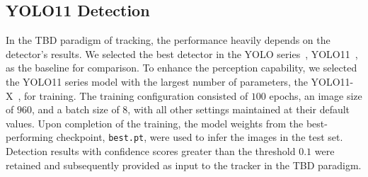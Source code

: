 \subsection{YOLO11 Detection}
In the TBD paradigm of tracking, the performance heavily depends on the detector's results. 
We selected the best detector in the YOLO series~\cite{redmon2016you}, YOLO11~\cite{yolo11}, as the baseline for comparison. 
To enhance the perception capability, we selected the YOLO11 series model with the largest number of parameters, the YOLO11-X~\cite{yolo11}, for training.
The training configuration consisted of $100$ epochs, an image size of $960$, and a batch size of $8$, with all other settings maintained at their default values. Upon completion of the training, the model weights from the best-performing checkpoint, \texttt{best.pt}, were used to infer the images in the test set. Detection results with confidence scores greater than the threshold $0.1$ were retained and subsequently provided as input to the tracker in the TBD paradigm.
